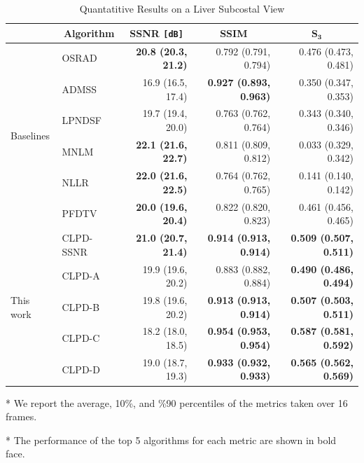 
%
\begin{table}
  \centering
  \caption{Quantatitive Results on a Liver Subcostal View}\label{table:liver1}
  \begin{threeparttable}
  \setlength{\tabcolsep}{3.5pt}
  \begin{tabular}{llrrr}
    \toprule
    & \multicolumn{1}{c}{\textbf{Algorithm}}
    & \multicolumn{1}{c}{\textbf{SSNR} \texttt{[dB]}}
    & \multicolumn{1}{c}{\textbf{SSIM}}
    & \multicolumn{1}{c}{\(\mathbf{S_{3}}\)} \\\midrule
    \multirow{6}{*}{\footnotesize{Baselines}} & OSRAD & \textbf{20.8 {\tiny(20.3, 21.2)}} & 0.792 {\tiny(0.791, 0.794)} & 0.476 {\tiny(0.473, 0.481)}\\
    & ADMSS & 16.9 {\tiny(16.5, 17.4)} & \textbf{0.927 {\tiny(0.893, 0.963)}} & 0.350 {\tiny(0.347, 0.353)} \\
    & LPNDSF & 19.7 {\tiny(19.4, 20.0)} & 0.763 {\tiny(0.762, 0.764)}         & 0.343 {\tiny(0.340, 0.346)} \\
    & MNLM & \textbf{22.1 {\tiny(21.6, 22.7)}} & 0.811 {\tiny(0.809, 0.812)}  & 0.033 {\tiny(0.329, 0.342)} \\
    & NLLR & \textbf{22.0 {\tiny(21.6, 22.5)}} & 0.764 {\tiny(0.762, 0.765)}  & 0.141 {\tiny(0.140, 0.142)} \\
    & PFDTV & \textbf{20.0 {\tiny(19.6, 20.4)}} & 0.822 {\tiny(0.820, 0.823)} & 0.461 {\tiny(0.456, 0.465)} \\
    \midrule
    \multirow{5}{*}{\footnotesize{This work}} & CLPD-{\scriptsize{SSNR}}  & \textbf{21.0 {\tiny(20.7, 21.4)}} & \textbf{0.914 {\tiny(0.913, 0.914)}} & \textbf{0.509 {\tiny(0.507, 0.511)}} \\
    & CLPD-A  & 19.9 {\tiny(19.6, 20.2)} & 0.883 {\tiny(0.882, 0.884)} & \textbf{0.490 {\tiny(0.486, 0.494)}} \\
    & CLPD-B  & 19.8 {\tiny(19.6, 20.2)} & \textbf{0.913 {\tiny(0.913, 0.914)}} & \textbf{0.507 {\tiny(0.503, 0.511)}} \\
    & CLPD-C  & 18.2 {\tiny(18.0, 18.5)} & \textbf{0.954 {\tiny(0.953, 0.954)}} & \textbf{0.587 {\tiny(0.581, 0.592)}} \\
    & CLPD-D & 19.0 {\tiny(18.7, 19.3)} & \textbf{0.933 {\tiny(0.932, 0.933)}} &  \textbf{0.565 {\tiny(0.562, 0.569)}} \\\bottomrule
  \end{tabular}
  \begin{tablenotes}
    \item[*] We report the average, 10\%, and \%90 percentiles of the metrics taken over 16 frames.
    \item[*] The performance of the top 5 algorithms for each metric are shown in bold face.
  \end{tablenotes}
  \end{threeparttable}
  \vspace{-0.1in}
\end{table}
%

